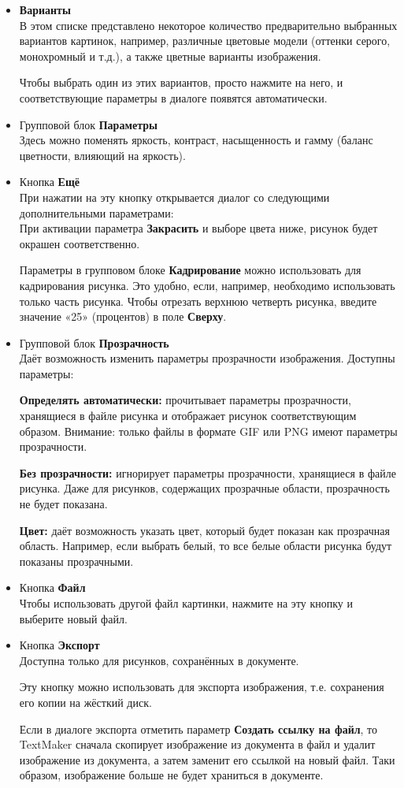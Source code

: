 \documentclass[a4paper,10pt]{article}
\begin{document}
\begin{itemize}
 \item \textbf{Варианты}\\
 В этом списке представлено некоторое количество предварительно выбранных вариантов картинок, например, различные цветовые модели (оттенки серого, монохромный и т.д.), а также цветные варианты изображения.
 
 Чтобы выбрать один из этих вариантов, просто нажмите на него, и соответствующие параметры в диалоге появятся автоматически.
 \item Групповой блок \textbf{Параметры}\\
 Здесь можно поменять яркость, контраст, насыщенность и гамму (баланс цветности, влияющий на яркость).
 \item Кнопка \textbf{Ещё}\\
 При нажатии на эту кнопку открывается диалог со следующими дополнительными параметрами:\\
При активации параметра \textbf{Закрасить} и выборе цвета ниже, рисунок будет окрашен соответственно.

Параметры в групповом блоке \textbf{Кадрирование} можно использовать для кадрирования рисунка. Это удобно, если, например, необходимо использовать только часть рисунка. Чтобы отрезать верхнюю четверть рисунка, введите значение «25» (процентов) в поле \textbf{Сверху}.
\item Групповой блок \textbf{Прозрачность}\\
Даёт возможность изменить параметры прозрачности изображения. Доступны параметры:

\textbf{Определять автоматически:} прочитывает параметры прозрачности, хранящиеся в файле рисунка и отображает рисунок соответствующим образом. Внимание: только файлы в формате GIF или PNG имеют параметры прозрачности.

\textbf{Без прозрачности:} игнорирует параметры прозрачности, хранящиеся в файле рисунка. Даже для рисунков, содержащих прозрачные области, прозрачность не будет показана.

\textbf{Цвет:} даёт возможность указать цвет, который будет показан как прозрачная область. Например, если выбрать белый, то все белые области рисунка будут показаны прозрачными.
\item Кнопка \textbf{Файл}\\
Чтобы использовать другой файл картинки, нажмите на эту кнопку и выберите новый файл.
\item Кнопка \textbf{Экспорт}\\
Доступна только для рисунков, сохранённых в документе.

Эту кнопку можно использовать для экспорта изображения, т.е. сохранения его копии на жёсткий диск.

Если в диалоге экспорта отметить параметр \textbf{Создать ссылку на файл}, то TextMaker сначала скопирует изображение из документа в файл и удалит изображение из документа, а затем заменит его ссылкой на новый файл. Таки образом, изображение больше не будет храниться в документе.
\end{itemize}
\end{document}
